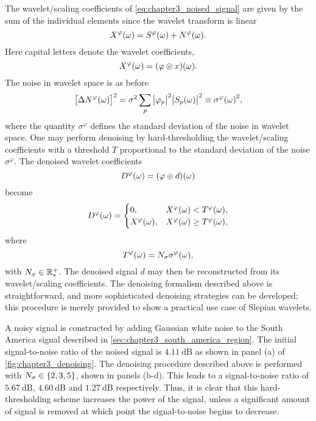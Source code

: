 The wavelet/scaling coefficients of \cref{eq:chapter3_noised_signal} are given by the sum of the individual elements since the wavelet transform is linear
%
\begin{equation}
	X^{\varphi}(\omega)
	= S^{\varphi}(\omega) + N^{\varphi}(\omega).
\end{equation}
%
Here capital letters denote the wavelet coefficients, \ie{}
%
\begin{equation}
	X^{\varphi}(\omega) = (\varphi \circledcirc{} x)(\omega).
\end{equation}
%
The noise in wavelet space is as before
%
\begin{equation}
	{\big[\Delta N^{\varphi}(\omega)\big]}^{2}
	= \sigma^{2} \sum\limits_{p} \big\lvert{\varphi}_{p}\big\rvert^{2} \big\lvert{S}_{p}(\omega)\big\rvert^{2}
	\equiv {\sigma^{\varphi}(\omega)}^{2},
\end{equation}
%
where the quantity \(\sigma^{\varphi}\) defines the standard deviation of the noise in wavelet space.
One may perform denoising by hard-thresholding the wavelet/scaling coefficients with a threshold \(T\) proportional to the standard deviation of the noise \(\sigma^{\varphi}\).
The denoised wavelet coefficients
%
\begin{equation}
	D^{\varphi}(\omega) = (\varphi \circledcirc{} d)(\omega)
\end{equation}
%
become
%
\begin{equation}
	D^{\varphi}(\omega) =
	\begin{cases}
		0,
		 & X^{\varphi}(\omega) < T^{\varphi}(\omega),    \\
		X^{\varphi}(\omega),
		 & X^{\varphi}(\omega) \geq T^{\varphi}(\omega),
	\end{cases}
\end{equation}
%
where
%
\begin{equation}
	T^{\varphi}(\omega)
	= N_{\sigma}\sigma^{\varphi}(\omega),
\end{equation}
%
with \(N_{\sigma} \in \mathbb{R}_{\ast}^{+}{}\).
The denoised signal \(d\) may then be reconstructed from its wavelet/scaling coefficients.
The denoising formalism described above is straightforward, and more sophisticated denoising strategies can be developed; this procedure is merely provided to show a practical use case of Slepian wavelets.

A noisy signal is constructed by adding Gaussian white noise to the South America signal described in \cref{sec:chapter3_south_america_region}.
The initial signal-to-noise ratio of the noised signal is \(\SI{4.11}{\dB}\) as shown in panel (a) of \cref{fig:chapter3_denoising}.
The denoising procedure described above is performed with \(N_{\sigma} \in \{2, 3, 5\}\), shown in panels (b-d).
This leads to a signal-to-noise ratio of \(\SI{5.67}{\dB}\), \(\SI{4.60}{\dB}\) and \(\SI{1.27}{\dB}\) respectively.
Thus, it is clear that this hard-thresholding scheme increases the power of the signal, unless a significant amount of signal is removed at which point the signal-to-noise begins to decrease.

